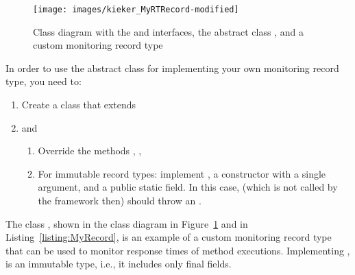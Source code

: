 \begin{figure}[ht]\centering
\texttt{[image: images/kieker\_MyRTRecord-modified]}
\caption{Class diagram with the  and  interfaces, the abstract %
class , and a custom monitoring record type %
}
\label{sec:monitoringrecord:interfacesAndImplementingClasses}
\end{figure}


\noindent In order to use the abstract class for implementing your own monitoring record type, you need to:

\begin{enumerate}
\item Create a class that extends 
\item  and
\begin{enumerate}
\item Override the methods , , 
\item For immutable record types: implement , a constructor %
with a single  argument, and a public static  field. %
In this case,  (which is not called by the framework then) should %
throw an .
\end{enumerate}
\end{enumerate}

\noindent The class , shown in the class diagram in %
Figure~\ref{sec:monitoringrecord:interfacesAndImplementingClasses} and in %
Listing~\ref{listing:MyRecord}, is an example of a custom monitoring record type %
that can be used to monitor response times of method executions. %
Implementing ,  is %
an immutable type, i.e., it includes only final fields. %

\enlargethispage{1cm}


\ %

\setJavaCodeListing


